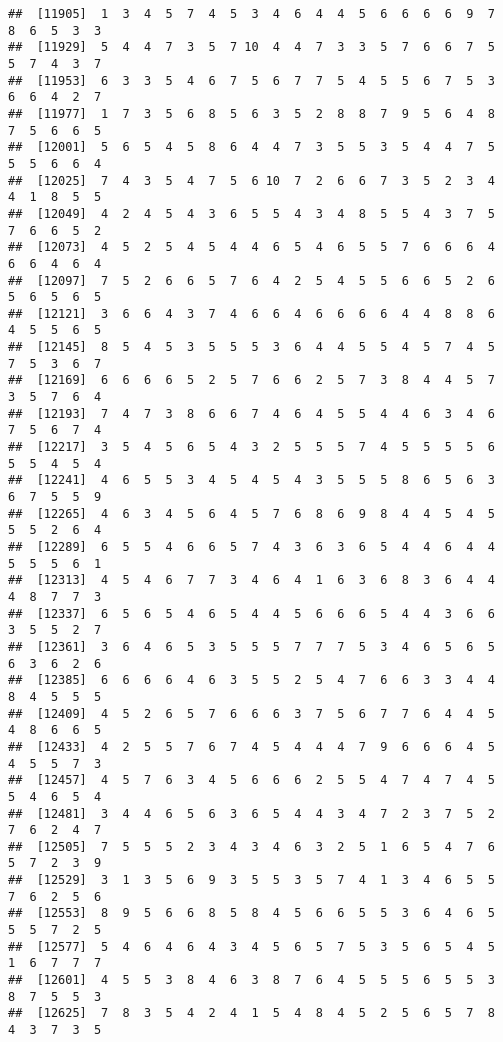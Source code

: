 \documentclass[
]{book}
\begin{document}
\begin{verbatim}
##  [11905]  1  3  4  5  7  4  5  3  4  6  4  4  5  6  6  6  6  9  7  8  6  5  3  3
##  [11929]  5  4  4  7  3  5  7 10  4  4  7  3  3  5  7  6  6  7  5  5  7  4  3  7
##  [11953]  6  3  3  5  4  6  7  5  6  7  7  5  4  5  5  6  7  5  3  6  6  4  2  7
##  [11977]  1  7  3  5  6  8  5  6  3  5  2  8  8  7  9  5  6  4  8  7  5  6  6  5
##  [12001]  5  6  5  4  5  8  6  4  4  7  3  5  5  3  5  4  4  7  5  5  5  6  6  4
##  [12025]  7  4  3  5  4  7  5  6 10  7  2  6  6  7  3  5  2  3  4  4  1  8  5  5
##  [12049]  4  2  4  5  4  3  6  5  5  4  3  4  8  5  5  4  3  7  5  7  6  6  5  2
##  [12073]  4  5  2  5  4  5  4  4  6  5  4  6  5  5  7  6  6  6  4  6  6  4  6  4
##  [12097]  7  5  2  6  6  5  7  6  4  2  5  4  5  5  6  6  5  2  6  5  6  5  6  5
##  [12121]  3  6  6  4  3  7  4  6  6  4  6  6  6  6  4  4  8  8  6  4  5  5  6  5
##  [12145]  8  5  4  5  3  5  5  5  3  6  4  4  5  5  4  5  7  4  5  7  5  3  6  7
##  [12169]  6  6  6  6  5  2  5  7  6  6  2  5  7  3  8  4  4  5  7  3  5  7  6  4
##  [12193]  7  4  7  3  8  6  6  7  4  6  4  5  5  4  4  6  3  4  6  7  5  6  7  4
##  [12217]  3  5  4  5  6  5  4  3  2  5  5  5  7  4  5  5  5  5  6  5  5  4  5  4
##  [12241]  4  6  5  5  3  4  5  4  5  4  3  5  5  5  8  6  5  6  3  6  7  5  5  9
##  [12265]  4  6  3  4  5  6  4  5  7  6  8  6  9  8  4  4  5  4  5  5  5  2  6  4
##  [12289]  6  5  5  4  6  6  5  7  4  3  6  3  6  5  4  4  6  4  4  5  5  5  6  1
##  [12313]  4  5  4  6  7  7  3  4  6  4  1  6  3  6  8  3  6  4  4  4  8  7  7  3
##  [12337]  6  5  6  5  4  6  5  4  4  5  6  6  6  5  4  4  3  6  6  3  5  5  2  7
##  [12361]  3  6  4  6  5  3  5  5  5  7  7  7  5  3  4  6  5  6  5  6  3  6  2  6
##  [12385]  6  6  6  6  4  6  3  5  5  2  5  4  7  6  6  3  3  4  4  8  4  5  5  5
##  [12409]  4  5  2  6  5  7  6  6  6  3  7  5  6  7  7  6  4  4  5  4  8  6  6  5
##  [12433]  4  2  5  5  7  6  7  4  5  4  4  4  7  9  6  6  6  4  5  4  5  5  7  3
##  [12457]  4  5  7  6  3  4  5  6  6  6  2  5  5  4  7  4  7  4  5  5  4  6  5  4
##  [12481]  3  4  4  6  5  6  3  6  5  4  4  3  4  7  2  3  7  5  2  7  6  2  4  7
##  [12505]  7  5  5  5  2  3  4  3  4  6  3  2  5  1  6  5  4  7  6  5  7  2  3  9
##  [12529]  3  1  3  5  6  9  3  5  5  3  5  7  4  1  3  4  6  5  5  7  6  2  5  6
##  [12553]  8  9  5  6  6  8  5  8  4  5  6  6  5  5  3  6  4  6  5  5  5  7  2  5
##  [12577]  5  4  6  4  6  4  3  4  5  6  5  7  5  3  5  6  5  4  5  1  6  7  7  7
##  [12601]  4  5  5  3  8  4  6  3  8  7  6  4  5  5  5  6  5  5  3  8  7  5  5  3
##  [12625]  7  8  3  5  4  2  4  1  5  4  8  4  5  2  5  6  5  7  8  4  3  7  3  5

\end{verbatim}
\end{document}

